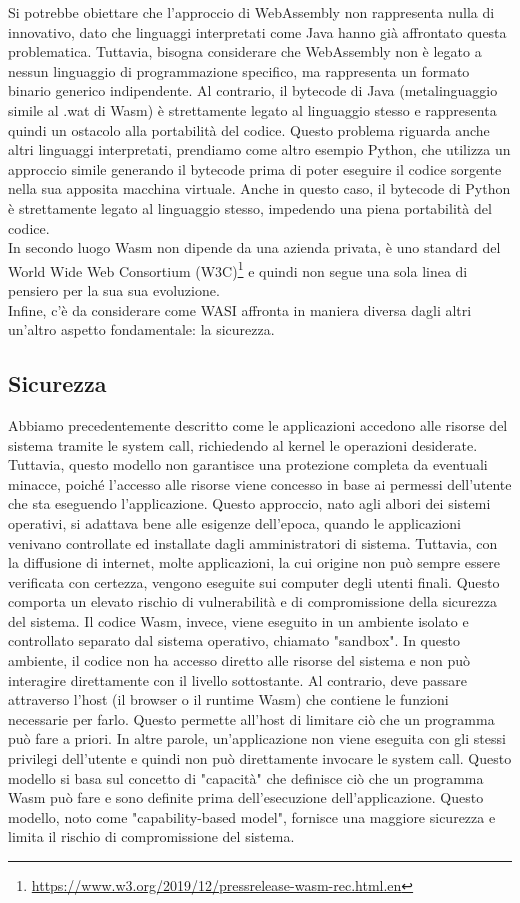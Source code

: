 Si potrebbe obiettare che l'approccio di WebAssembly non rappresenta nulla di innovativo, dato che linguaggi
interpretati come Java hanno già affrontato questa problematica. Tuttavia, bisogna considerare che WebAssembly non è
legato a nessun linguaggio di programmazione specifico, ma rappresenta un formato binario generico indipendente. Al
contrario, il bytecode di Java (metalinguaggio simile al .wat di Wasm) è strettamente legato al linguaggio stesso e
rappresenta quindi un ostacolo alla portabilità del codice. Questo problema riguarda anche altri linguaggi interpretati,
prendiamo come altro esempio Python, che utilizza un approccio simile generando il bytecode prima di poter eseguire il
codice sorgente nella sua apposita macchina virtuale. Anche in questo caso, il bytecode di Python è strettamente legato
al linguaggio stesso, impedendo una piena portabilità del codice. \\In secondo luogo Wasm non dipende da una azienda
privata, è uno standard del World Wide Web Consortium
(W3C)\footnote{\url{https://www.w3.org/2019/12/pressrelease-wasm-rec.html.en}} e quindi non segue una sola linea di
pensiero per la sua sua evoluzione. \\
Infine, c'è da considerare come WASI affronta in maniera diversa dagli altri un'altro aspetto fondamentale: la
sicurezza.

\subsection{Sicurezza}
Abbiamo precedentemente descritto come le applicazioni accedono alle risorse del sistema tramite le system call,
richiedendo al kernel le operazioni desiderate. Tuttavia, questo modello non garantisce una protezione completa da
eventuali minacce, poiché l'accesso alle risorse viene concesso in base ai permessi dell'utente che sta eseguendo
l'applicazione. Questo approccio, nato agli albori dei sistemi operativi, si adattava bene alle esigenze dell'epoca,
quando le applicazioni venivano controllate ed installate dagli amministratori di sistema. Tuttavia, con la diffusione
di internet, molte applicazioni, la cui origine non può sempre essere verificata con certezza, vengono eseguite sui
computer degli utenti finali. Questo comporta un elevato rischio di vulnerabilità e di compromissione della sicurezza
del sistema. Il codice Wasm, invece, viene eseguito in un ambiente isolato e controllato separato dal sistema operativo,
chiamato "sandbox". In questo ambiente, il codice non ha accesso diretto alle risorse del sistema e non può interagire
direttamente con il livello sottostante. Al contrario, deve passare attraverso l'host (il browser o il runtime Wasm) che
contiene le funzioni necessarie per farlo. Questo permette all'host di limitare ciò che un programma può fare a priori.
In altre parole, un'applicazione non viene eseguita con gli stessi privilegi dell'utente e quindi non può direttamente
invocare le system call. Questo modello si basa sul concetto di "capacità" che definisce ciò che un programma Wasm può
fare e sono definite prima dell'esecuzione dell'applicazione. Questo modello, noto come "capability-based model",
fornisce una maggiore sicurezza e limita il rischio di compromissione del sistema.


